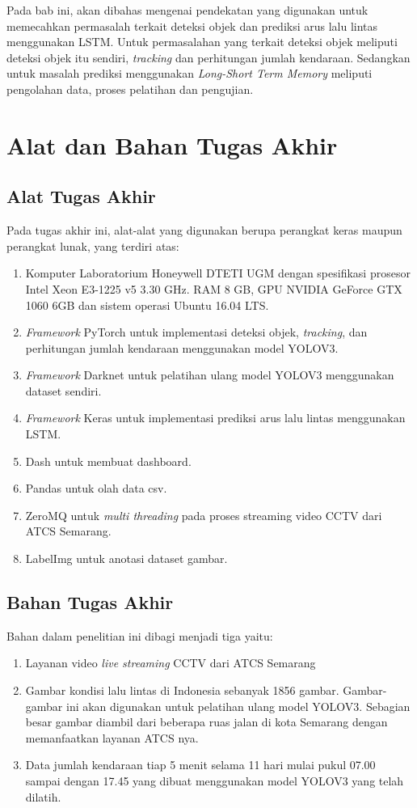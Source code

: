 \documentclass[../thesis.tex]{subfiles}
\begin{document}
Pada bab ini, akan dibahas mengenai pendekatan yang digunakan untuk memecahkan permasalah terkait deteksi objek dan prediksi arus lalu lintas menggunakan LSTM. Untuk permasalahan yang terkait deteksi objek meliputi deteksi objek itu sendiri, \textit{tracking} dan perhitungan jumlah kendaraan. Sedangkan
untuk masalah prediksi menggunakan \textit{Long-Short Term Memory} meliputi pengolahan data, proses pelatihan dan pengujian.

\section{Alat dan Bahan Tugas Akhir}
\subsection{Alat Tugas Akhir}
Pada tugas akhir ini, alat-alat yang digunakan berupa perangkat keras maupun perangkat
lunak, yang terdiri atas:
\begin{enumerate}
	\item Komputer Laboratorium Honeywell DTETI UGM dengan spesifikasi prosesor Intel Xeon E3-1225 v5 3.30 GHz. RAM 8 GB, GPU NVIDIA GeForce GTX 1060 6GB dan sistem operasi Ubuntu 16.04 LTS.
	\item \textit{Framework} PyTorch untuk implementasi deteksi objek, \textit{tracking}, dan perhitungan jumlah kendaraan menggunakan model YOLOV3.
	\item \textit{Framework} Darknet untuk pelatihan ulang model YOLOV3 menggunakan dataset sendiri.
	\item \textit{Framework} Keras untuk implementasi prediksi arus lalu lintas menggunakan LSTM.
	\item Dash untuk membuat dashboard.
	\item Pandas untuk olah data csv.
	\item ZeroMQ untuk \textit{multi threading} pada proses streaming video CCTV dari ATCS Semarang.
	\item LabelImg untuk anotasi dataset gambar.
\end{enumerate}

\subsection{Bahan Tugas Akhir}
Bahan dalam penelitian ini dibagi menjadi tiga yaitu:
\begin{enumerate}
	\item Layanan video \textit{live streaming} CCTV dari ATCS Semarang 
	\item Gambar kondisi lalu lintas di Indonesia sebanyak 1856 gambar. Gambar-gambar ini akan digunakan untuk pelatihan ulang model YOLOV3. Sebagian besar gambar diambil dari beberapa ruas jalan di kota Semarang dengan memanfaatkan layanan ATCS nya.
	\item Data jumlah kendaraan tiap 5 menit selama 11 hari mulai pukul 07.00 sampai dengan 17.45 yang dibuat menggunakan model YOLOV3 yang telah dilatih.
\end{enumerate}	
\end{document}
